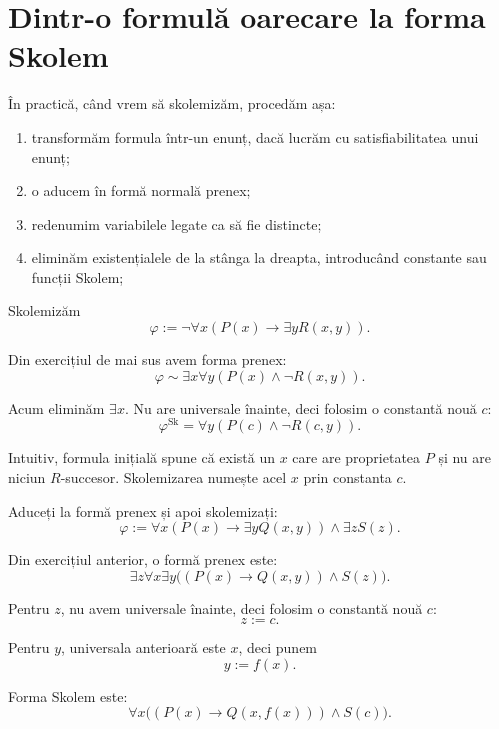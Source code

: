 \section{Dintr-o formulă oarecare la forma Skolem}

În practică, când vrem să skolemizăm, procedăm așa:
\begin{enumerate}
	\item transformăm formula într-un enunț, dacă lucrăm cu satisfiabilitatea unui enunț;
	\item o aducem în formă normală prenex;
	\item redenumim variabilele legate ca să fie distincte;
	\item eliminăm existențialele de la stânga la dreapta, introducând constante sau funcții Skolem;
\end{enumerate}

\begin{eg}
	Skolemizăm
	\[
		\varphi := \neg\forall x(P(x)\to \exists yR(x,y)).
	\]

	Din exercițiul de mai sus avem forma prenex:
	\[
		\varphi \sim \exists x\forall y(P(x)\land \neg R(x,y)).
	\]

	Acum eliminăm \( \exists x \). Nu are universale înainte, deci folosim o constantă nouă \(c\):
	\[
		\varphi^{\mathrm{Sk}}
		=
		\forall y(P(c)\land \neg R(c,y)).
	\]

	Intuitiv, formula inițială spune că există un \(x\) care are proprietatea \(P\) și nu are niciun \(R\)-succesor. Skolemizarea numește acel \(x\) prin constanta \(c\).
\end{eg}

\begin{ex}
	Aduceți la formă prenex și apoi skolemizați:
	\[
		\varphi := \forall x(P(x)\to \exists yQ(x,y)) \land \exists zS(z).
	\]
\end{ex}

\begin{solutie}
	Din exercițiul anterior, o formă prenex este:
	\[
		\exists z\forall x\exists y\big((P(x)\to Q(x,y)) \land S(z)\big).
	\]

	Pentru \(z\), nu avem universale înainte, deci folosim o constantă nouă \(c\):
	\[
		z := c.
	\]

	Pentru \(y\), universala anterioară este \(x\), deci punem
	\[
		y := f(x).
	\]

	Forma Skolem este:
	\[
		\forall x\big((P(x)\to Q(x,f(x))) \land S(c)\big).
	\]
\end{solutie}

